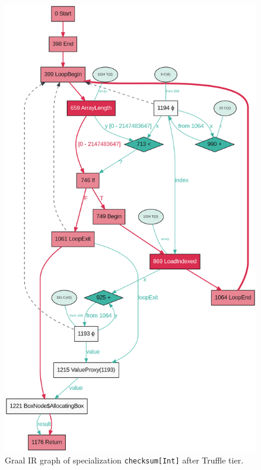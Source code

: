\begin{figure}
	\centering
	\includegraphics[width=0.5\columnwidth]{figures/checksum:Int:TruffleTier.png}
	\caption{Graal IR graph of specialization \texttt{checksum[Int]} after Truffle tier.}
\end{figure} 